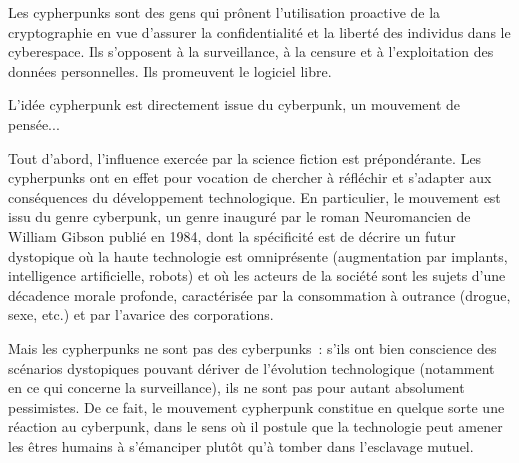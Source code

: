 Les cypherpunks sont des gens qui prônent l'utilisation proactive de la cryptographie en vue d'assurer la confidentialité et la liberté des individus dans le cyberespace. Ils s'opposent à la surveillance, à la censure et à l'exploitation des données personnelles. Ils promeuvent le logiciel libre. %


L'idée cypherpunk est directement issue du cyberpunk, un mouvement de pensée...

Tout d'abord, l'influence exercée par la science fiction est prépondérante. Les cypherpunks ont en effet pour vocation de chercher à réfléchir et s'adapter aux conséquences du développement technologique. En particulier, le mouvement est issu du genre cyberpunk, un genre inauguré par le roman Neuromancien de William Gibson publié en 1984, dont la spécificité est de décrire un futur dystopique où la haute technologie est omniprésente (augmentation par implants, intelligence artificielle, robots) et où les acteurs de la société sont les sujets d'une décadence morale profonde, caractérisée par la consommation à outrance (drogue, sexe, etc.) et par l'avarice des corporations.

Mais les cypherpunks ne sont pas des cyberpunks~: s'ils ont bien conscience des scénarios dystopiques pouvant dériver de l'évolution technologique (notamment en ce qui concerne la surveillance), ils ne sont pas pour autant absolument pessimistes. De ce fait, le mouvement cypherpunk constitue en quelque sorte une réaction au cyberpunk, dans le sens où il postule que la technologie peut amener les êtres humains à s'émanciper plutôt qu'à tomber dans l'esclavage mutuel.

